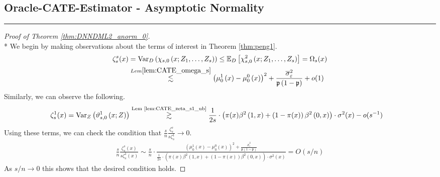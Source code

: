 \subsection{Oracle-CATE-Estimator - Asymptotic Normality}
\hrule

\begin{proof}[Proof of Theorem \ref{thm:DNNDML2_anorm_0}]\mbox{}\\*
    We begin by making observations about the terms of interest in Theorem \ref{thm:peng1}.
    \begin{equation}
        \begin{aligned}
            \zeta_{s}^{s}(x)
            & = \text{Var}_{D}\left(\chi_{s,0}\left(x; Z_{1}, \dotsc, Z_{s}\right)\right)
            \leq \mathbb{E}_{D}\left[\chi_{s,0}^{2}\left(x; Z_{1}, \dotsc, Z_{s}\right)\right]
            = \Omega_{s}(x)\\
            & \overset{Lem \ref{lem:CATE_omega_s}}{\lesssim} \left(\mu_{0}^{1}\left(x\right) - \mu_{0}^{0}\left(x\right)\right)^2 + \frac{\overline{\sigma}^2_{\varepsilon}}{\mathfrak{p}\left(1 - \mathfrak{p}\right)} + o(1)
        \end{aligned}
    \end{equation}
    Similarly, we can observe the following.
    \begin{equation}
        \begin{aligned}
            \zeta_{s}^{1}(x)
            & = \text{Var}_{Z}\left(\vartheta_{s,0}^{1}\left(x; Z\right)\right)
            \overset{\text{Lem \ref{lem:CATE_zeta_s1_ub}}}{\gtrsim} 
            \frac{1}{2s} \cdot \left(\pi(x) \beta^{2}\left(1 , x\right) + \left(1-\pi(x)\right) \beta^{2}\left(0 , x\right) \right)\cdot \sigma^{2}(x) - o(s^{-1})
        \end{aligned}
    \end{equation}
    Using these terms, we can check the condition that $\frac{s}{n} \frac{\zeta_{s}^{s}}{s \zeta_{s}^{1}} \rightarrow 0$.
    \begin{equation}
        \begin{aligned}
            \frac{s}{n} \frac{\zeta_{s}^{s}(x)}{s \zeta_{s}^{1}(x)}
            \sim \frac{s}{n} \cdot \frac{\left(\mu_{0}^{1}\left(x\right) - \mu_{0}^{0}\left(x\right)\right)^2 + \frac{\overline{\sigma}^2_{\varepsilon}}{\mathfrak{p}\left(1 - \mathfrak{p}\right)}}{\frac{1}{2s} \cdot \left(\pi(x) \beta^{2}\left(1 , x\right) + \left(1-\pi(x)\right) \beta^{2}\left(0 , x\right) \right)\cdot \sigma^{2}(x)}
            = O(s/n)
        \end{aligned}
    \end{equation}
    As $s/n \rightarrow 0$ this shows that the desired condition holds.
\end{proof}